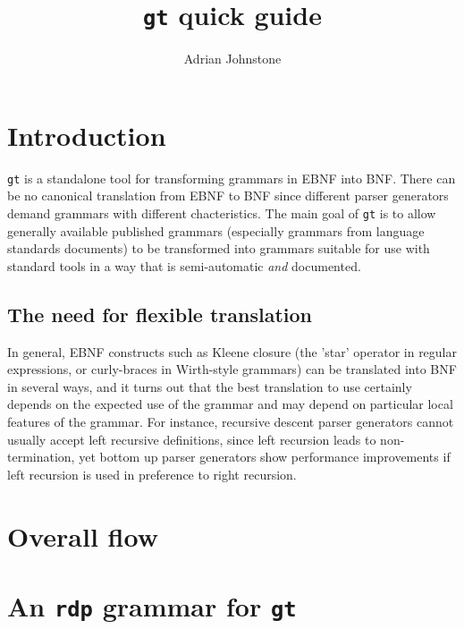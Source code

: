 \title{{\tt gt} quick guide}
\author{Adrian Johnstone}

\makecstitle
\section{Introduction}
{\tt gt} is a standalone tool for transforming grammars in EBNF
into BNF. There can be no canonical translation from EBNF to BNF since
different parser generators demand grammars with different
chacteristics. The main goal of {\tt gt} is to allow generally
available published grammars (especially grammars from language
standards documents) to be transformed into grammars suitable for use
with standard tools in a way that is semi-automatic {\em and}
documented. 

\subsection{The need for flexible translation}
In general, EBNF constructs such as Kleene closure (the
'star' operator in regular expressions, or curly-braces in Wirth-style
grammars) can be translated into BNF in several ways, and 
it turns out that the best translation to use certainly
depends on the expected use of the grammar and may depend on
particular local features of the grammar. For instance, recursive descent
parser generators cannot usually accept left recursive definitions,
since left recursion leads to non-termination, yet bottom up parser
generators show performance improvements if left recursion is used in
preference to right recursion.

\section{Overall flow}



\appendix
\section{An {\tt rdp} grammar for {\tt gt}}
{\footnotesize
\begin{verbatim}
\end{verbatim}
}

